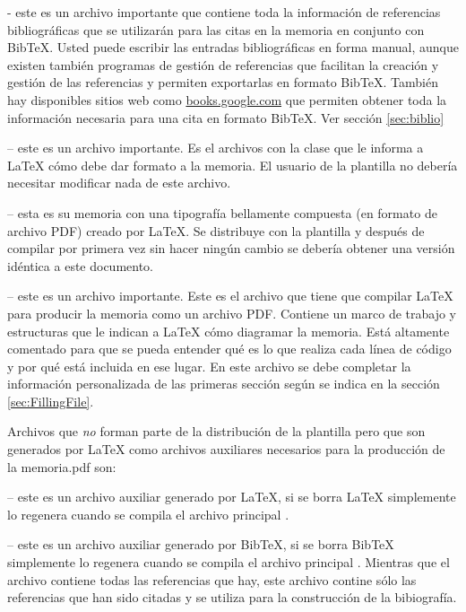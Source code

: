  - este es un archivo importante que contiene toda la información de referencias bibliográficas que se utilizarán para las citas en la memoria en conjunto con BibTeX. Usted puede escribir las entradas bibliográficas en forma manual, aunque existen también programas de gestión de referencias que facilitan la creación y gestión de las referencias y permiten exportarlas en formato BibTeX.  También hay disponibles sitios web como \url{books.google.com} que permiten obtener toda la información necesaria para una cita en formato BibTeX. Ver sección \ref{sec:biblio}

 -- este es un archivo importante. Es el archivos con la clase que le informa a \LaTeX{} cómo debe dar formato a la memoria. El usuario de la plantilla no debería necesitar modificar nada de este archivo.

 -- esta es su memoria con una tipografía bellamente compuesta (en formato de archivo PDF) creado por \LaTeX{}. Se distribuye con la plantilla y después de compilar por primera vez sin hacer ningún cambio se debería obtener una versión idéntica a este documento.

 -- este es un archivo importante. Este es el archivo que tiene que compilar \LaTeX{} para producir la memoria como un archivo PDF. Contiene un marco de trabajo y estructuras que le indican a \LaTeX{} cómo diagramar la memoria.  Está altamente comentado para que se pueda entender qué es lo que realiza cada línea de código y por qué está incluida en ese lugar.  En este archivo se debe completar la información personalizada de las primeras sección según se indica en la sección \ref{sec:FillingFile}.

Archivos que \emph{no} forman parte de la distribución de la plantilla pero que son generados por \LaTeX{} como archivos auxiliares necesarios para la producción de la memoria.pdf son:

 -- este es un archivo auxiliar generado por \LaTeX{}, si se borra \LaTeX{} simplemente lo regenera cuando se compila el archivo principal .

 -- este es un archivo auxiliar generado por BibTeX, si se borra BibTeX simplemente lo regenera cuando se compila el archivo principal . Mientras que el archivo  contiene todas las referencias que hay, este archivo  contine sólo las referencias que han sido citadas y se utiliza para la construcción de la bibiografía.

